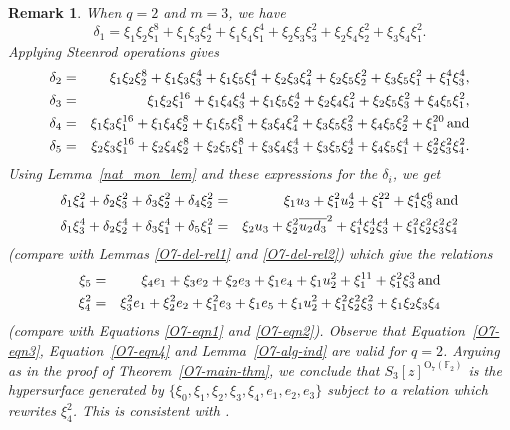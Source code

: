 \documentclass{amsart}
\newtheorem{remark}[subsection]{Remark}
\newcommand{\field}{\mathbb{F}}
\newcommand{\orth}[2]{{{\text{O}_{{#1}}(\field_{#2})}}}
\begin{document}
\begin{remark}\label{O7-rem}
    When $q=2$ and $m=3$, we have
    $$\delta_1=\xi_1\xi_2\xi_1^8+\xi_1\xi_3\xi_2^4+\xi_1\xi_4\xi_1^4
    +\xi_2\xi_3\xi_3^2+\xi_2\xi_4\xi_2^2+\xi_3\xi_4\xi_1^2.$$
    Applying Steenrod operations gives 
    \begin{eqnarray*}
        \delta_2&=&\xi_1\xi_2\xi_2^8+\xi_1\xi_3\xi_3^4+\xi_1\xi_5\xi_1^4
    +\xi_2\xi_3\xi_4^2+\xi_2\xi_5\xi_2^2+\xi_3\xi_5\xi_1^2+\xi_1^4\xi_3^4,\\
    \delta_3&=&\xi_1\xi_2\xi_1^{16}+\xi_1\xi_4\xi_3^4+\xi_1\xi_5\xi_2^4
    +\xi_2\xi_4\xi_4^2+\xi_2\xi_5\xi_3^2+\xi_4\xi_5\xi_1^2,\\
    \delta_4&=&\xi_1\xi_3\xi_1^{16}+\xi_1\xi_4\xi_2^8+\xi_1\xi_5\xi_1^8
    +\xi_3\xi_4\xi_4^2+\xi_3\xi_5\xi_3^2+\xi_4\xi_5\xi_2^2+\xi_1^{20}
    \,{\rm and}\\
    \delta_5&=&\xi_2\xi_3\xi_1^{16}+\xi_2\xi_4\xi_2^8+\xi_2\xi_5\xi_1^8
       +\xi_3\xi_4\xi_3^4+\xi_3\xi_5\xi_2^4+\xi_4\xi_5\xi_1^4
    +\xi_2^2\xi_3^2\xi_4^2.    
    \end{eqnarray*}
    Using Lemma~\ref{nat_mon_lem} and these expressions for the $\delta_i$,
    we get
    \begin{eqnarray*}
        \delta_1\xi_4^2+\delta_2\xi_3^2+\delta_3\xi_2^2+\delta_4\xi_2^2
        &=&\xi_1u_3+\xi_1^2 u_2^4+\xi_1^{22}+\xi_1^4\xi_3^6 \,{\rm and}\\
        \delta_1\xi_3^4+\delta_2\xi_2^4+\delta_3\xi_1^4+\delta_5\xi_1^2
        &=&\xi_2u_3+\xi_2^2\overline{u_2d_3}^2
        +\xi_1^4\xi_2^4\xi_3^4+\xi_1^2\xi_2^2\xi_3^2\xi_4^2
    \end{eqnarray*}
    (compare with Lemmas \ref{O7-del-rel1} and \ref{O7-del-rel2})
    which give the relations
    \begin{eqnarray*}
        \xi_5&=&\xi_4e_1+\xi_3e_2+\xi_2e_3+\xi_1e_4+\xi_1 u_2^2
        +\xi_1^{11}+\xi_1^2\xi_3^3 \, {\rm and}\\
        \xi_4^2&=&\xi_3^2e_1+\xi_2^2e_2+\xi_1^2e_3+\xi_1e_5+\xi_1 u_2^2
        +\xi_1^2\xi_2^2\xi_3^2+\xi_1\xi_2\xi_3\xi_4
    \end{eqnarray*}
    (compare with Equations \ref{O7-eqn1} and \ref{O7-eqn2}).
    Observe that Equation~\ref{O7-eqn3}, Equation~\ref{O7-eqn4}
    and Lemma~\ref{O7-alg-ind} are valid for $q=2$.
    Arguing as in the proof of Theorem~\ref{O7-main-thm},
    we conclude that $S_3[z]^{\orth{7}{2}}$ is the hypersurface
    generated by $\{\xi_0,\xi_1,\xi_2,\xi_3,\xi_4,e_1,e_2,e_3\}$
    subject to a relation which rewrites $\xi_4^2$.
    This is consistent with \cite[Theorem 6.1]{Kropholler+Rajaei+Segal:05}.
    \end{remark}
\end{document}
